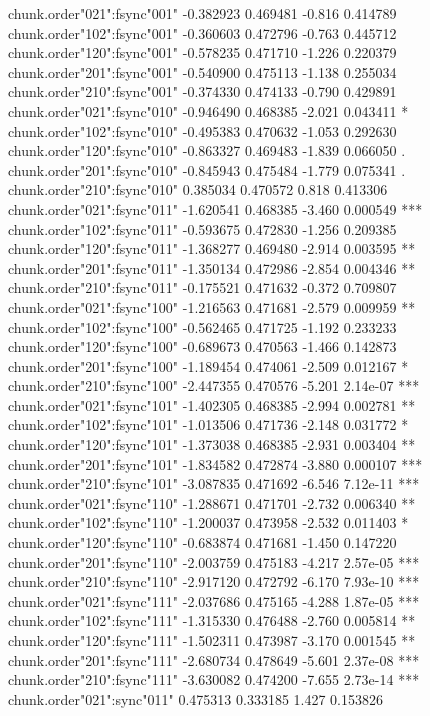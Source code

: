 \documentclass[11pt]{article}
\begin{document}
\begin{Schunk}
\begin{Soutput}
chunk.order"021":fsync"001"    -0.382923   0.469481  -0.816 0.414789    
chunk.order"102":fsync"001"    -0.360603   0.472796  -0.763 0.445712    
chunk.order"120":fsync"001"    -0.578235   0.471710  -1.226 0.220379    
chunk.order"201":fsync"001"    -0.540900   0.475113  -1.138 0.255034    
chunk.order"210":fsync"001"    -0.374330   0.474133  -0.790 0.429891    
chunk.order"021":fsync"010"    -0.946490   0.468385  -2.021 0.043411 *  
chunk.order"102":fsync"010"    -0.495383   0.470632  -1.053 0.292630    
chunk.order"120":fsync"010"    -0.863327   0.469483  -1.839 0.066050 .  
chunk.order"201":fsync"010"    -0.845943   0.475484  -1.779 0.075341 .  
chunk.order"210":fsync"010"     0.385034   0.470572   0.818 0.413306    
chunk.order"021":fsync"011"    -1.620541   0.468385  -3.460 0.000549 ***
chunk.order"102":fsync"011"    -0.593675   0.472830  -1.256 0.209385    
chunk.order"120":fsync"011"    -1.368277   0.469480  -2.914 0.003595 ** 
chunk.order"201":fsync"011"    -1.350134   0.472986  -2.854 0.004346 ** 
chunk.order"210":fsync"011"    -0.175521   0.471632  -0.372 0.709807    
chunk.order"021":fsync"100"    -1.216563   0.471681  -2.579 0.009959 ** 
chunk.order"102":fsync"100"    -0.562465   0.471725  -1.192 0.233233    
chunk.order"120":fsync"100"    -0.689673   0.470563  -1.466 0.142873    
chunk.order"201":fsync"100"    -1.189454   0.474061  -2.509 0.012167 *  
chunk.order"210":fsync"100"    -2.447355   0.470576  -5.201 2.14e-07 ***
chunk.order"021":fsync"101"    -1.402305   0.468385  -2.994 0.002781 ** 
chunk.order"102":fsync"101"    -1.013506   0.471736  -2.148 0.031772 *  
chunk.order"120":fsync"101"    -1.373038   0.468385  -2.931 0.003404 ** 
chunk.order"201":fsync"101"    -1.834582   0.472874  -3.880 0.000107 ***
chunk.order"210":fsync"101"    -3.087835   0.471692  -6.546 7.12e-11 ***
chunk.order"021":fsync"110"    -1.288671   0.471701  -2.732 0.006340 ** 
chunk.order"102":fsync"110"    -1.200037   0.473958  -2.532 0.011403 *  
chunk.order"120":fsync"110"    -0.683874   0.471681  -1.450 0.147220    
chunk.order"201":fsync"110"    -2.003759   0.475183  -4.217 2.57e-05 ***
chunk.order"210":fsync"110"    -2.917120   0.472792  -6.170 7.93e-10 ***
chunk.order"021":fsync"111"    -2.037686   0.475165  -4.288 1.87e-05 ***
chunk.order"102":fsync"111"    -1.315330   0.476488  -2.760 0.005814 ** 
chunk.order"120":fsync"111"    -1.502311   0.473987  -3.170 0.001545 ** 
chunk.order"201":fsync"111"    -2.680734   0.478649  -5.601 2.37e-08 ***
chunk.order"210":fsync"111"    -3.630082   0.474200  -7.655 2.73e-14 ***
chunk.order"021":sync"011"      0.475313   0.333185   1.427 0.153826    

\end{Soutput}
\end{Schunk}
\end{document}
